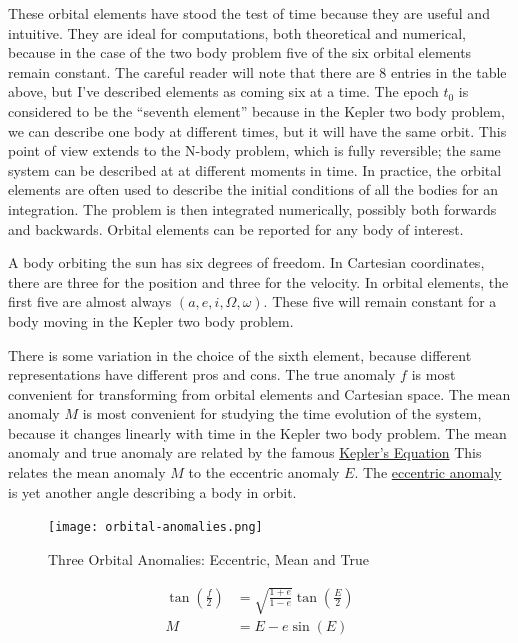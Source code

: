 These orbital elements have stood the test of time because they are useful and intuitive.
They are ideal for computations, both theoretical and numerical, because in the case of the two body problem five of the six orbital elements remain constant.
The careful reader will note that there are 8 entries in the table above, but I've described elements as coming six at a time.
The epoch $t_0$ is considered to be the ``seventh element'' because in the Kepler two body problem, we can describe one body at different times, but it will have the same orbit.
This point of view extends to the N-body problem, which is fully reversible; the same system can be described at at different moments in time.
In practice, the orbital elements are often used to describe the initial conditions of all the bodies for an integration.
The problem is then integrated numerically, possibly both forwards and backwards.
Orbital elements can be reported for any body of interest.

A body orbiting the sun has six degrees of freedom.  
In Cartesian coordinates, there are three for the position and three for the velocity.
In orbital elements, the first five are almost always $(a, e, i, \Omega, \omega)$.
These five will remain constant for a body moving in the Kepler two body problem.

There is some variation in the choice of the sixth element, because different representations have different pros and cons.
The true anomaly $f$ is most convenient for transforming from orbital elements and Cartesian space.
The mean anomaly $M$ is most convenient for studying the time evolution of the system, because it changes linearly with time in the Kepler two body problem.
The mean anomaly and true anomaly are related by the famous 
\href{https://en.wikipedia.org/wiki/Kepler\%27s_equation}{Kepler's Equation}
This relates the mean anomaly $M$ to the eccentric anomaly $E$.
The \href{https://en.wikipedia.org/wiki/Eccentric_anomaly}{eccentric anomaly} is yet another angle describing a body in orbit.
\begin{figure}
\begin{center}
\texttt{[image: orbital-anomalies.png]}
\caption{Three Orbital Anomalies: Eccentric, Mean and True}
\end{center}
\end{figure}

\begin{align*}
\tan \left(\frac{f}{2} \right) &= \sqrt{\frac{1+e}{1-e}} \tan \left( \frac{E}{2} \right) \\
M &= E - e \sin(E)
\end{align*}
 
